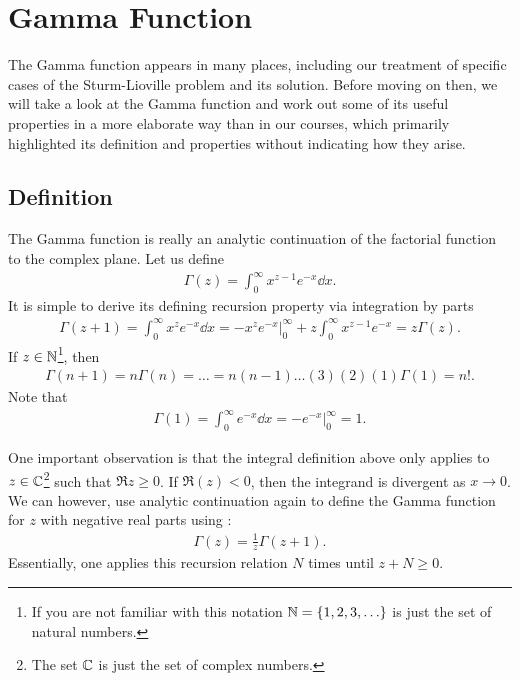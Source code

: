 \chapter{Gamma Function}

The Gamma function appears in many places, including our treatment of specific cases of the Sturm-Lioville problem and its solution.
Before moving on then, we will take a look at the Gamma function and work out some of its useful properties in a more elaborate way than in our courses, which primarily highlighted its definition and properties without indicating how they arise.

\section{Definition}

The Gamma function is really an analytic continuation of the factorial function to the complex plane.
Let us define
\begin{eqnarray}
    \label{eq:Gamma-def}
    \Gamma(z) = \int_{0}^{\infty} x^{z-1} e^{-x} \dd{x}
.\end{eqnarray}
It is simple to derive its defining recursion property via integration by parts
\begin{eqnarray}
    \Gamma(z+1) = \int_{0}^{\infty} x^{z} e^{-x} \dd{x} = -x^{z} e^{-x} \Big|_{0}^{\infty} + z \int_{0}^{\infty} x^{z-1}e^{-x} = z \Gamma(z)
.\end{eqnarray}
If $z \in \mathbb{N}$\footnote{If you are not familiar with this notation $\mathbb{N} = \{ 1,2,3,\ldots \} $ is just the set of natural numbers.}, then
\begin{eqnarray}
    \label{eq:Gamma-recursive}
    \Gamma(n+1) = n \Gamma(n) = \ldots = n (n-1) \hdots (3)(2)(1) \Gamma(1) = n!
.\end{eqnarray}
Note that
\begin{eqnarray}
    \Gamma(1) = \int_{0}^{\infty} e^{-x} \dd{x} = -e^{-x} \Big|_{0}^{\infty} = 1
.\end{eqnarray}

One important observation is that the integral definition above only applies to $z \in \mathbb{C}$\footnote{The set $\mathbb{C}$ is just the set of complex numbers.} such that $\Re{z} \geq 0$.
If $\Re(z) < 0$, then the integrand is divergent as $x \rightarrow 0$.
We can however, use analytic continuation again to define the Gamma function for $z$ with negative real parts using :
\begin{eqnarray}
    \Gamma(z) = \frac{1}{z} \Gamma(z+1)
.\end{eqnarray}
Essentially, one applies this recursion relation $N$ times until $z + N \geq 0$.


